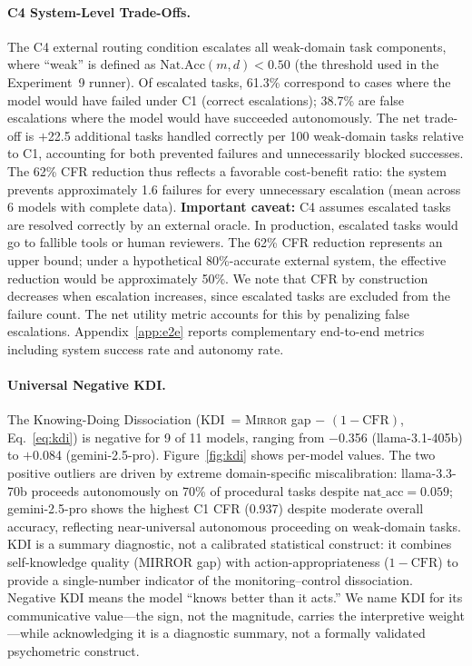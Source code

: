 \documentclass[10pt]{article}
\newcommand{\mirror}{\textsc{Mirror}}
\newcommand{\KDI}{KDI}
\newcommand{\CFR}{CFR}
\begin{document}
\paragraph{C4 System-Level Trade-Offs.}
The C4 external routing condition escalates all weak-domain task components,
where ``weak'' is defined as $\text{Nat.Acc}(m,d) < 0.50$ (the threshold used in
the Experiment~9 runner). Of escalated tasks,
61.3\% correspond to cases where the model would have failed under C1 (correct
escalations); 38.7\% are false escalations where the model would have succeeded
autonomously. The net trade-off is $+$22.5 additional tasks handled correctly per
100 weak-domain tasks relative to C1, accounting for both prevented failures and
unnecessarily blocked successes. The 62\% CFR reduction thus reflects a favorable
cost-benefit ratio: the system prevents approximately 1.6 failures for every
unnecessary escalation (mean across 6 models with complete data).
\textbf{Important caveat:} C4 assumes escalated tasks are resolved correctly by an
external oracle. In production, escalated tasks would go to fallible tools or
human reviewers. The 62\% CFR reduction represents an upper bound; under a
hypothetical 80\%-accurate external system, the effective reduction would be
approximately 50\%.
We note that CFR by construction decreases when escalation increases, since
escalated tasks are excluded from the failure count. The net utility metric
accounts for this by penalizing false escalations. Appendix~\ref{app:e2e}
reports complementary end-to-end metrics including system success rate and
autonomy rate.

\paragraph{Universal Negative \KDI{}.}
The Knowing-Doing Dissociation (\KDI{}~= \mirror{} gap $-$ $(1 - \text{CFR})$,
Eq.~\ref{eq:kdi}) is negative for 9 of 11 models, ranging from $-$0.356 (llama-3.1-405b) to
$+$0.084 (gemini-2.5-pro). Figure~\ref{fig:kdi} shows per-model values. The two
positive outliers are driven by extreme domain-specific miscalibration:
llama-3.3-70b proceeds autonomously on 70\% of procedural tasks despite
$\text{nat\_acc} = 0.059$; gemini-2.5-pro shows the highest C1 \CFR{} (0.937)
despite moderate overall accuracy, reflecting near-universal autonomous
proceeding on weak-domain tasks.
KDI is a summary diagnostic, not a calibrated statistical construct: it combines
self-knowledge quality (MIRROR gap) with action-appropriateness ($1 - \text{CFR}$)
to provide a single-number indicator of the monitoring--control dissociation.
Negative KDI means the model ``knows better than it acts.'' We name KDI for its
communicative value---the sign, not the magnitude, carries the interpretive
weight---while acknowledging it is a diagnostic summary, not a formally validated
psychometric construct.
\end{document}
